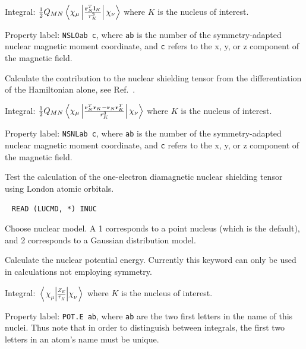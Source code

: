 \begin{description}
\begin{list}{}{}
\item Integral:
$\frac{1}{2}Q_{MN}\left<\chi_{\mu}\left|\frac{{\bf r}_N^T{\bf
l}_K}{r_{K}^3}\right|\chi_{\nu}\right>$
where $K$ is the nucleus of interest.
\item Property label: \verb|NSLOab c|, where \verb|ab| is the number
of the symmetry-adapted nuclear magnetic moment coordinate, and
\verb|c| refers to the x, y, or z component of the magnetic field.
\end{list}

\item[\Key{NSTNOL}] Calculate the contribution to the nuclear
shielding tensor from the
differentiation of the Hamiltonian alone, see Ref.~\cite{thpjjcp95}.

\begin{list}{}{}
\item Integral:
$\frac{1}{2}Q_{MN}\left<\chi_{\mu}\left|\frac{{\bf r}_N^T{\bf r}_K -
{\bf r}_N{\bf r}_K^T}{r_{K}^3}\right|\chi_{\nu}\right>$
where $K$ is the nucleus of interest.
\item Property label: \verb|NSNLab c|, where \verb|ab| is the number
of the symmetry-adapted nuclear magnetic moment coordinate, and
\verb|c| refers to the x, y, or z component of the magnetic field.
\end{list}

\item[\Key{NSTTST}] Test the calculation of the one-electron
diamagnetic  nuclear shielding
tensor using London atomic orbitals.

\item[\Key{NUCMOD}]\verb| |\newline
\verb|READ (LUCMD, *) INUC|

Choose nuclear model. A 1 corresponds to a point nucleus (which is the
default), and 2 corresponds to a Gaussian distribution model.

\item[\Key{NUCPOT}] Calculate the nuclear potential energy.
Currently this keyword can only be used in calculations not employing
symmetry.

\begin{list}{}{}
\item Integral:
$\left<\chi_{\mu}\left|\frac{Z_K}{r_{K}}\right|\chi_{\nu}\right>$
where $K$ is the nucleus of interest.
\item Property label: \verb|POT.E ab|, where \verb|ab| are the two
first letters in the name of this nuclei. Thus note that in order
to distinguish between integrals, the first two letters in an
atom's name must be unique.
\end{list}


\end{description}
